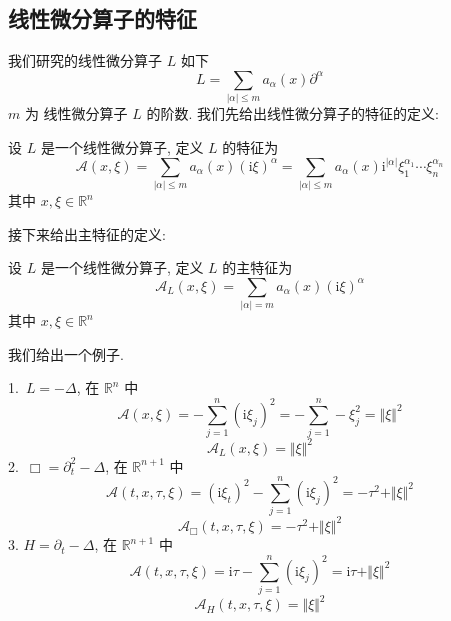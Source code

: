 \documentclass[11pt]{ctexart}[UTF8]
\begin{document}
\subsection{线性微分算子的特征}
我们研究的线性微分算子 $L$ 如下
\begin{equation*}
    L = \sum\limits_{|\alpha| \leq m} a_{\alpha}(x) \partial^{\alpha}
\end{equation*}
$m$ 为 线性微分算子 $L$ 的阶数. 
我们先给出线性微分算子的特征的定义:
\begin{definition}[线性微分算子的特征]
    设 $L$ 是一个线性微分算子, 定义 $L$ 的特征为
\begin{equation*}
    \mathscr{A}(x,\xi) = \sum\limits_{|\alpha|\leq m} a_{\alpha}(x) (\mathrm{i}\xi)^{\alpha}= \sum\limits_{|\alpha|\leq m} a_{\alpha}(x) \mathrm{i}^{|\alpha|} \xi_1^{\alpha_1} \cdots \xi_n^{\alpha_n} 
\end{equation*}
其中 $x,\xi \in \mathbb{R}^{n}$
\end{definition}
接下来给出主特征的定义:
\begin{definition}[线性微分算子的主特征]
    设 $L$ 是一个线性微分算子, 定义 $L$ 的主特征为
\begin{equation*}
    \mathscr{A}_L(x,\xi) = \sum\limits_{|\alpha|= m} a_{\alpha}(x) (\mathrm{i}\xi)^{\alpha}
\end{equation*}
其中 $x,\xi \in \mathbb{R}^{n}$
\end{definition}
我们给出一个例子.
\begin{example}
    1.\ $L = -\Delta $, 在 $\mathbb{R}^n$ 中
\begin{equation*}
    \mathscr{A}(x,\xi) = -\sum\limits_{j=1}^{n} (\mathrm{i}\xi_{j})^2 = -\sum\limits_{j=1}^{n} -\xi_{j}^2 = \Vert\xi\Vert^2
\end{equation*}
\begin{equation*}
    \mathscr{A}_L(x,\xi) = \Vert\xi\Vert^2
\end{equation*}
2.\ $\Box = \partial_t^2 - \Delta$, 在 $\mathbb{R}^{n+1}$ 中
\begin{equation*}
    \mathscr{A}(t,x,\tau,\xi) = (\mathrm{i}\xi_{t})^2 - \sum\limits_{j=1}^{n} (\mathrm{i}\xi_{j})^2 = -\tau^2 + \Vert\xi\Vert^2
\end{equation*}
\begin{equation*}
    \mathscr{A}_\Box(t,x,\tau,\xi) = -\tau^2 + \Vert\xi\Vert^2
\end{equation*}
3. $H = \partial_t - \Delta$, 在 $\mathbb{R}^{n+1}$ 中
\begin{equation*}
    \mathscr{A}(t,x,\tau,\xi) = \mathrm{i}\tau - \sum\limits_{j=1}^{n} (\mathrm{i}\xi_{j})^2 = \mathrm{i}\tau + \Vert\xi\Vert^2
\end{equation*}
\begin{equation*}
    \mathscr{A}_H(t,x,\tau,\xi) = \Vert\xi\Vert^2
\end{equation*}
\end{example}
\end{document}
